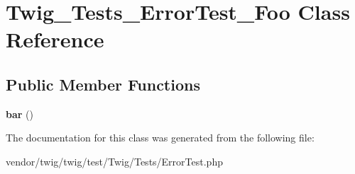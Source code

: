 \hypertarget{classTwig__Tests__ErrorTest__Foo}{}\section{Twig\+\_\+\+Tests\+\_\+\+Error\+Test\+\_\+\+Foo Class Reference}
\label{classTwig__Tests__ErrorTest__Foo}
\subsection*{Public Member Functions}
\begin{DoxyCompactItemize}
\item 
{\bfseries bar} ()\hypertarget{classTwig__Tests__ErrorTest__Foo_a6507c5bed01010e07317336c8dd16382}{}\label{classTwig__Tests__ErrorTest__Foo_a6507c5bed01010e07317336c8dd16382}

\end{DoxyCompactItemize}


The documentation for this class was generated from the following file\+:\begin{DoxyCompactItemize}
\item 
vendor/twig/twig/test/\+Twig/\+Tests/Error\+Test.\+php\end{DoxyCompactItemize}
